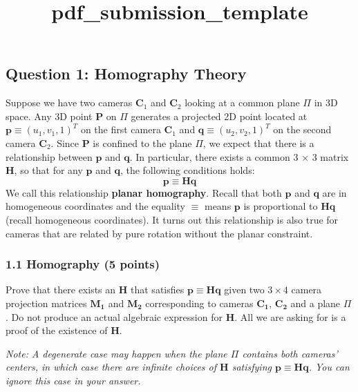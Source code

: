 \documentclass[11pt]{article}
\title{pdf\_submission\_template}
\begin{document}
    
    \maketitle
    
    

    
    \hypertarget{question-1-homography-theory}{%
\subsection{Question 1: Homography
Theory}\label{question-1-homography-theory}}

Suppose we have two cameras \(\mathbf{C}_1\) and \(\mathbf{C}_2\)
looking at a common plane \(\Pi\) in 3D space. Any 3D point
\(\mathbf{P}\) on \(\Pi\) generates a projected 2D point located at
\(\mathbf{p} \equiv (u_1,v_1,1)^T\) on the first camera \(\mathbf{C}_1\)
and \(\mathbf{q} \equiv (u_2,v_2,1)^T\) on the second camera
\(\mathbf{C}_2\). Since \(\mathbf{P}\) is confined to the plane \(\Pi\),
we expect that there is a relationship between \(\mathbf{p}\) and
\(\mathbf{q}\). In particular, there exists a common 3 \(\times\) 3
matrix \(\mathbf{H}\), so that for any \(\mathbf{p}\) and
\(\mathbf{q}\), the following conditions holds: \begin{equation}
\mathbf{p \equiv Hq}
\label{eq:homography}
\end{equation} We call this relationship \textbf{planar homography}.
Recall that both \(\mathbf{p}\) and \(\mathbf{q}\) are in homogeneous
coordinates and the equality \(\equiv\) means \(\mathbf{p}\) is
proportional to \(\mathbf{Hq}\) (recall homogeneous coordinates). It
turns out this relationship is also true for cameras that are related by
pure rotation without the planar constraint.

    \hypertarget{homography-5-points}{%
\subsubsection{1.1 Homography (5 points)}\label{homography-5-points}}

Prove that there exists an \(\mathbf{H}\) that satisfies
\(\mathbf{p \equiv Hq}\) given two \({3 \times 4}\) camera projection
matrices \(\mathbf{M_1}\) and \(\mathbf{M_2}\) corresponding to cameras
\(\mathbf{C_1}\), \(\mathbf{C_2}\) and a plane \(\Pi\). Do not produce
an actual algebraic expression for \(\mathbf{H}\). All we are asking for
is a proof of the existence of \(\mathbf{H}\).

\emph{Note: A degenerate case may happen when the plane \(\Pi\) contains
both cameras' centers, in which case there are infinite choices of
\(\mathbf{H}\) satisfying \(\mathbf{p \equiv Hq}\). You can ignore this
case in your answer.}
\end{document}
